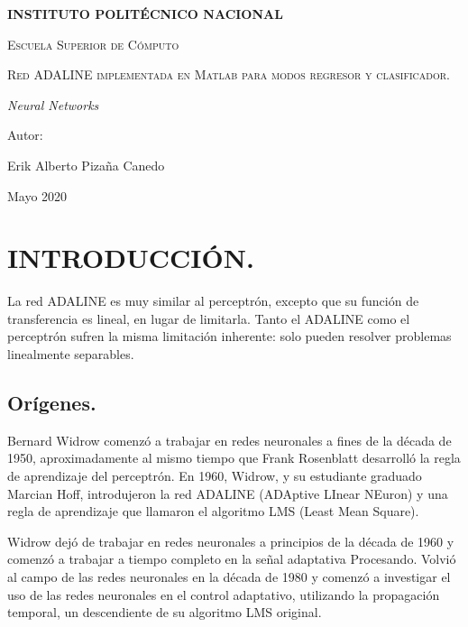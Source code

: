 \documentclass[]{article}
\begin{document}
	
	\begin{titlepage}
		\centering
		{\bfseries\LARGE INSTITUTO POLITÉCNICO NACIONAL \par}
		\vspace{1cm}
		{\scshape\Large Escuela Superior de Cómputo \par}
		\vspace{3cm}
		{\scshape\Huge Red ADALINE implementada en Matlab para modos regresor y clasificador. \par}
		\vspace{3cm}
		{\itshape\Large Neural Networks \par}
		\vfill
		{\Large Autor: \par}
		{\Large Erik Alberto Pizaña Canedo \par}
		\vfill
		{\Large Mayo 2020 \par}
	\end{titlepage}
	
	\section{INTRODUCCIÓN.}
	La red ADALINE es muy similar al perceptrón, excepto que su función de transferencia es lineal, en lugar de limitarla. Tanto el ADALINE como el perceptrón sufren la misma limitación inherente: solo pueden resolver problemas linealmente separables.
	

	\subsection{Orígenes.}
	Bernard Widrow comenzó a trabajar en redes neuronales a fines de la década de 1950, aproximadamente al mismo tiempo que Frank Rosenblatt desarrolló la regla de aprendizaje del perceptrón. En 1960, Widrow, y su estudiante graduado Marcian Hoff, introdujeron la red ADALINE (ADAptive LInear NEuron) y una regla de aprendizaje que llamaron el algoritmo LMS (Least Mean Square).
	
	Widrow dejó de trabajar en redes neuronales a principios de la década de 1960 y comenzó a trabajar a tiempo completo en la señal adaptativa Procesando. Volvió al campo de las redes neuronales en la década de 1980 y comenzó a investigar el uso de las redes neuronales en el control adaptativo, utilizando la propagación temporal, un descendiente de su algoritmo LMS original.
	
\end{document}
